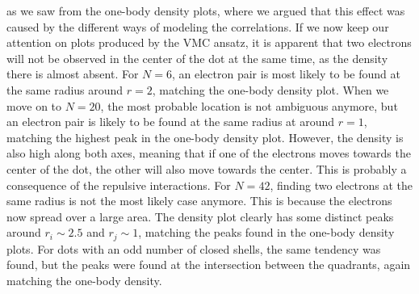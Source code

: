 as we saw from the one-body density plots, where we argued that this effect was caused by the different ways of modeling the correlations. If we now keep our attention on plots produced by the VMC ansatz, it is apparent that two electrons will not be observed in the center of the dot at the same time, as the density there is almost absent. For $N=6$, an electron pair is most likely to be found at the same radius around $r=2$, matching the one-body density plot. When we move on to $N=20$, the most probable location is not ambiguous anymore, but an electron pair is likely to be found at the same radius at around $r=1$, matching the highest peak in the one-body density plot. However, the density is also high along both axes, meaning that if one of the electrons moves towards the center of the dot, the other will also move towards the center. This is probably a consequence of the repulsive interactions. For $N=42$, finding two electrons at the same radius is not the most likely case anymore. This is because the electrons now spread over a large area. The density plot clearly has some distinct peaks around $r_i\sim 2.5$ and $r_j\sim 1$, matching the peaks found in the one-body density plots. For dots with an odd number of closed shells, the same tendency was found, but the peaks were found at the intersection between the quadrants, again matching the one-body density.

